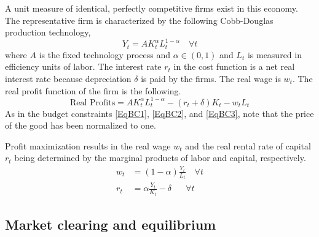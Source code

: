 \documentclass[letterpaper,12pt]{article}
\theoremstyle{definition}
\begin{document}
\begin{spacing}{1.5}
    A unit measure of identical, perfectly competitive firms exist in this economy. The representative firm is characterized by the following Cobb-Douglas production technology,
    \begin{equation}\label{EqCobbDougProd}
       Y_t = A K_t^\alpha L_t^{1-\alpha} \quad \forall t
    \end{equation}
    where $A$ is the fixed technology process and $\alpha\in(0,1)$ and $L_t$ is measured in efficiency units of labor. The interest rate $r_t$ in the cost function is a net real interest rate because depreciation $\delta$ is paid by the firms. The real wage is $w_t$. The real profit function of the firm is the following.
    \begin{equation}\label{EqFirmProfit}
       \text{Real Profits} = A K_t^\alpha L_t^{1-\alpha} - (r_t + \delta)K_t - w_t L_t
    \end{equation}
    As in the budget constraints \eqref{EqBC1}, \eqref{EqBC2}, and \eqref{EqBC3}, note that the price of the good has been normalized to one.

    Profit maximization results in the real wage $w_t$ and the real rental rate of capital $r_t$ being determined by the marginal products of labor and capital, respectively.
    \begin{align}
       w_t &= (1-\alpha)\frac{Y_t}{L_t} \quad \forall t \label{EqFOCwage}\\
       r_t &= \alpha\frac{Y_t}{K_t} - \delta \quad\:\:\: \forall t \label{EqFOCrate}
    \end{align}


  \subsection{Market clearing and equilibrium}\label{SecMCandEqlbm}


\end{spacing}
\end{document}
